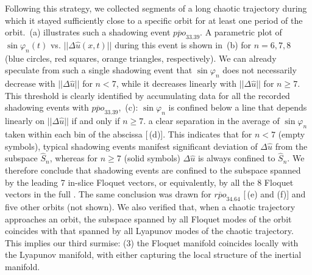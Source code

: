 \documentclass[prl,aps,preprint,showpacs,superscriptaddress]{revtex4-1} %
\begin{document}
Following this strategy, we collected segments of a long chaotic
trajectory during which it stayed sufficiently close to a specific orbit
for at least one period of the orbit. \,(a)
illustrates such a shadowing event 
$\overline{ppo}_{33.39}$. A parametric plot of $\sin\varphi_n(t)$ vs.
$||\Delta\hat{u}(x,t)||$ during this event is shown in
\,(b) for $n=6,7,8$ (blue circles, red squares,
orange triangles, respectively). We can already speculate from such a
single shadowing event that $\sin\varphi_n$ does not necessarily decrease
with $||\Delta\hat{u}||$ for $n<7$, while it decreases linearly with
$||\Delta\hat{u}||$ for $n\geq7$. This threshold is clearly identified by
accumulating data for all the recorded shadowing events with
$\overline{ppo}_{33.39}$, \,(c):
$\sin\varphi_n$ is confined below a line that depends linearly on
$||\Delta\hat{u}||$ if and only if $n\geq7$. 
a clear
separation in the average of $\sin\varphi_n$ taken within each bin of the
abscissa [\,(d)]. This indicates that for $n<7$
(empty symbols), typical shadowing events manifest significant deviation
of $\Delta\hat{u}$ from the subspace $\hat{S}_n$, whereas for $n\geq7$
(solid symbols) $\Delta\hat{u}$ is always confined to $\hat{S}_n$. We
therefore conclude that shadowing events are confined to the subspace
spanned by the leading 7 in-slice Floquet vectors, or equivalently, by
all the 8 {\entangled} Floquet vectors in the full \statesp. The
same conclusion was drawn for $\overline{rpo}_{34.64}$
[\,(e) and (f)] and five other orbits
(not shown). We also verified that, when a chaotic trajectory approaches
an orbit, the subspace spanned by all {\entangled} Floquet modes of the
orbit coincides with that spanned by all {\entangled} Lyapunov modes of
the chaotic trajectory. This implies our third surmise: (3) the {\entangled}
Floquet manifold coincides locally with the {\entangled} Lyapunov
manifold, with either capturing the local structure of the inertial
manifold.
\end{document}
